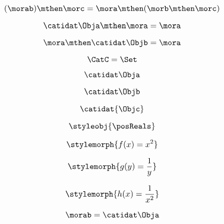 \begin{forslides}
    \begin{equation}
        \label{eq:semicats-slides-20}
        (\morab)
        \mthen \morc= \mora \mthen (\morb \mthen \morc)
    \end{equation}

    \begin{equation}
        \label{eq:semicats-slides-21}
        \catidat\Obja \mthen \mora = \mora
    \end{equation}

    \begin{equation}
        \label{eq:semicats-slides-22}
        \mora \mthen \catidat\Objb = \mora
    \end{equation}

    \begin{equation}
        \label{eq:semicats-slides-23}
        \CatC = \Set
    \end{equation}

    \begin{equation}
        \label{eq:semicats-slides-24}
        \catidat\Obja
    \end{equation}

    \begin{equation}
        \label{eq:semicats-slides-25}
        \catidat\Objb
    \end{equation}

    \begin{equation}
        \label{eq:semicats-slides-26}
        \catidat{\Objc}
    \end{equation}

    \begin{equation}
        \label{eq:semicats-slides-27}
        \styleobj{\posReals}
    \end{equation}

    \begin{equation}
        \label{eq:semicats-slides-28}
        \stylemorph{f(x) = x^2}
    \end{equation}

    \begin{equation}
        \label{eq:semicats-slides-29}
        \stylemorph{g(y) = \frac{1}{y}}
    \end{equation}

    \begin{equation}
        \label{eq:semicats-slides-30}
        \stylemorph{h(x) = \frac{1}{x^2}}
    \end{equation}

    \begin{equation}
        \label{eq:semicats-slides-31}
        \morab = \catidat\Obja
    \end{equation}


\end{forslides}

